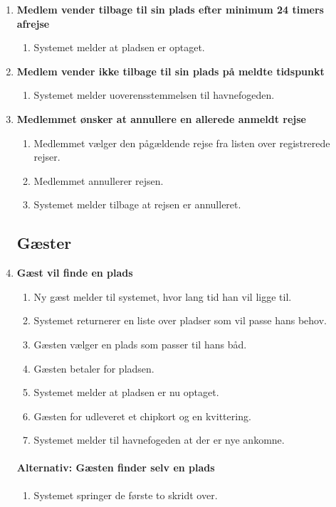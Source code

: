 \begin{enumerate}
    \item{\bf{Medlem vender tilbage til sin plads efter minimum 24 timers afrejse}}
      \begin{enumerate}
        \item Systemet melder at pladsen er optaget.
      \end{enumerate}


    \item{\bf{Medlem vender ikke tilbage til sin plads på meldte tidspunkt}}
      \begin{enumerate}
        \item Systemet melder uoverensstemmelsen til havnefogeden.
      \end{enumerate}


    \item{\bf{Medlemmet ønsker at annullere en allerede anmeldt rejse}}
      \begin{enumerate}
        \item Medlemmet vælger den pågældende rejse fra listen over registrerede rejser.
        \item Medlemmet annullerer rejsen.
        \item Systemet melder tilbage at rejsen er annulleret.
      \end{enumerate}


\subsection{Gæster}


    \item{\bf{Gæst vil finde en plads}}
      \begin{enumerate}
        \item Ny gæst melder til systemet, hvor lang tid han vil ligge til.
        \item Systemet returnerer en liste over pladser som vil passe hans behov.
        \item Gæsten vælger en plads som passer til hans båd.
        \item Gæsten betaler for pladsen.
        \item Systemet melder at pladsen er nu optaget.
        \item Gæsten for udleveret et chipkort og en kvittering.
        \item Systemet melder til havnefogeden at der er nye ankomne.
      \end{enumerate}

    \paragraph{Alternativ: Gæsten finder selv en plads}
      \begin{enumerate}
        \item Systemet springer de første to skridt over.
      \end{enumerate}



\end{enumerate}

